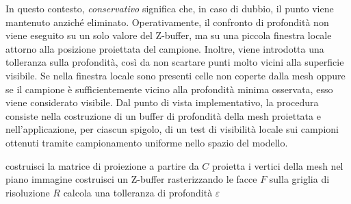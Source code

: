\documentclass[a4paper,11pt,titlepage,twoside]{book}
\newcommand{\1}{\mathbf{1}}
\numberwithin{equation}{chapter}
\theoremstyle{plain}
\theoremstyle{definition}
\begin{document}
	In questo contesto, \emph{conservativo} significa che, in caso di dubbio, il punto viene mantenuto anziché eliminato. Operativamente, il confronto di profondità non viene eseguito su un solo valore del Z-buffer, ma su una piccola finestra locale attorno alla posizione proiettata del campione. Inoltre, viene introdotta una tolleranza sulla profondità, così da non scartare punti molto vicini alla superficie visibile. Se nella finestra locale sono presenti celle non coperte dalla mesh oppure se il campione è sufficientemente vicino alla profondità minima osservata, esso viene considerato visibile.
	Dal punto di vista implementativo, la procedura consiste nella costruzione di un buffer di profondità della mesh proiettata e nell’applicazione, per ciascun spigolo, di un test di visibilità locale sui campioni ottenuti tramite campionamento uniforme nello spazio del modello.
	\begin{algorithm}[H]
		\caption{Culling conservativo dei campioni mediante Z-buffer}
		\label{alg:conservative-zbuffer-cull}
		
		costruisci la matrice di proiezione a partire da $C$\;
		proietta i vertici della mesh nel piano immagine\;
		costruisci un Z-buffer rasterizzando le facce $F$ sulla griglia di risoluzione $R$\;
		calcola una tolleranza di profondità $\varepsilon$\;
		
		\;
	\end{algorithm}
	
\end{document}
